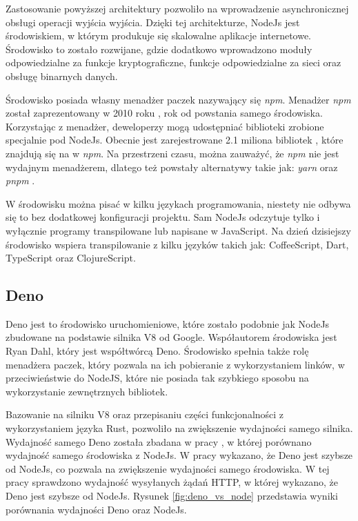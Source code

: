 Zastosowanie powyższej architektury pozwoliło na wprowadzenie asynchronicznej obsługi operacji wyjścia wyjścia. Dzięki tej architekturze, NodeJs jest środowiskiem, w którym produkuje się skalowalne aplikacje internetowe. Środowisko to zostało rozwijane, gdzie dodatkowo wprowadzono moduły odpowiedzialne za funkcje kryptograficzne, funkcje odpowiedzialne za sieci oraz obsługę binarnych danych.

Środowisko posiada własny menadżer paczek nazywający się \textit{npm}. Menadżer \textit{npm} został zaprezentowany w 2010 roku \cite{npm}, rok od powstania samego środowiska. Korzystając z menadżer, deweloperzy mogą udostępniać biblioteki zrobione specjalnie pod NodeJs. Obecnie jest zarejestrowane 2.1 miliona bibliotek \cite{npm}, które znajdują się na w \textit{npm}. Na przestrzeni czasu, można zauważyć, że \textit{npm} nie jest wydajnym menadżerem, dlatego też powstały alternatywy takie jak: \textit{yarn} \cite{yarn} oraz \textit{pnpm} \cite{pnpm}. 

W środowisku można pisać w kilku językach programowania, niestety nie odbywa się to bez dodatkowej konfiguracji projektu. Sam NodeJs odczytuje tylko i wyłącznie programy transpilowane lub napisane w JavaScript. Na dzień dzisiejszy środowisko wspiera transpilowanie z kilku języków takich jak: CoffeeScript, Dart, TypeScript oraz ClojureScript.

\subsection{Deno}
Deno jest to środowisko uruchomieniowe, które zostało podobnie jak NodeJs zbudowane na podstawie silnika V8 od Google. Współautorem środowiska jest Ryan Dahl, który jest współtwórcą Deno. Środowisko spełnia także rolę menadżera paczek, który pozwala na ich pobieranie z wykorzystaniem linków, w przeciwieństwie do NodeJS, które nie posiada tak szybkiego sposobu na wykorzystanie zewnętrznych bibliotek.

Bazowanie na silniku V8 oraz przepisaniu części funkcjonalności z wykorzystaniem języka Rust, pozwoliło na zwiększenie wydajności samego silnika. Wydajność samego Deno została zbadana w pracy \cite{deno_performance}, w której porównano wydajność samego środowiska z NodeJs. W pracy wykazano, że Deno jest szybsze od NodeJs, co pozwala na zwiększenie wydajności samego środowiska. W tej pracy sprawdzono wydajność wysyłanych żądań HTTP, w której wykazano, że Deno jest szybsze od NodeJs. Rysunek \ref{fig:deno_vs_node} przedstawia wyniki porównania wydajności Deno oraz NodeJs.

